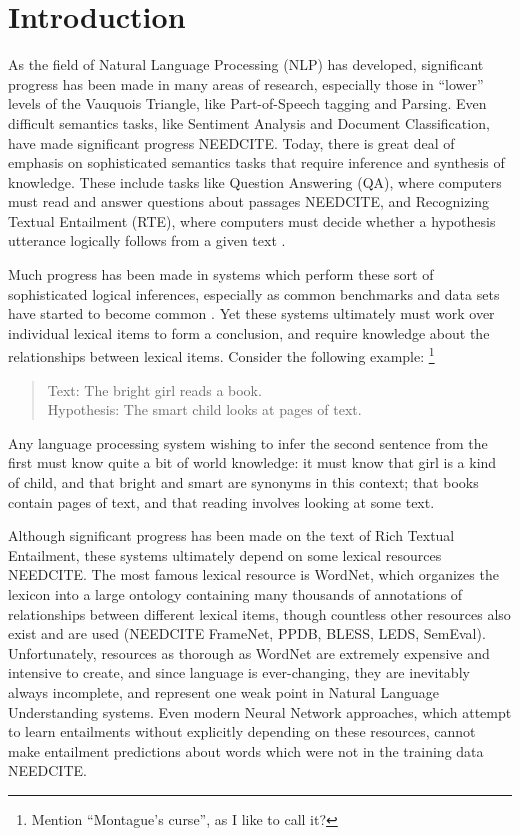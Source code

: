 \documentclass[letterpaper]{article}
\begin{document}
\tableofcontents
\pagebreak

\section{Introduction}

As the field of Natural Language Processing (NLP) has developed, significant
progress has been made in many areas of research, especially those in ``lower''
levels of the Vauquois Triangle, like Part-of-Speech tagging and Parsing.  Even
difficult semantics tasks, like Sentiment Analysis and Document Classification,
have made significant progress NEEDCITE. Today, there is great deal of emphasis
on sophisticated semantics tasks that require inference and synthesis of
knowledge. These include tasks like Question Answering (QA), where computers
must read and answer questions about passages NEEDCITE, and Recognizing Textual
Entailment (RTE), where computers must decide whether a hypothesis utterance
logically follows from a given text \cite{marelli:2014:semeval}.

Much progress has been made in systems which perform these sort of sophisticated
logical inferences, especially as common benchmarks and data sets have started
to become common \cite{marelli:2014:semeval,bowman:2015:emnlp,NEEDCITE}. Yet these
systems ultimately must work over individual lexical items to form a
conclusion, and require knowledge about the relationships between lexical
items. Consider the following example:
\footnote{Mention ``Montague's curse'', as I like to call it?}
\begin{quote}
  Text: The bright girl reads a book.\\
  Hypothesis: The smart child looks at pages of text.
\end{quote}
Any language processing system wishing to infer the second sentence from
the first must know quite a bit of world knowledge: it must know that
girl is a kind of child, and that bright and smart are synonyms in this
context; that books contain pages of text, and that reading involves looking
at some text.

Although significant progress has been made on the text of
Rich Textual Entailment, these systems ultimately depend on some lexical
resources NEEDCITE. The most famous lexical resource is WordNet, which
organizes the lexicon into a large ontology containing many thousands of
annotations of relationships between different lexical items, though countless
other resources also exist and are used (NEEDCITE FrameNet, PPDB, BLESS, LEDS,
SemEval). Unfortunately, resources as thorough as WordNet are extremely
expensive and intensive to create, and since language is ever-changing, they
are inevitably always incomplete, and represent one weak point in Natural
Language Understanding systems. Even modern Neural Network approaches,
which attempt to learn entailments without explicitly depending on these
resources, cannot make entailment predictions about words which were not
in the training data NEEDCITE.
\end{document}
